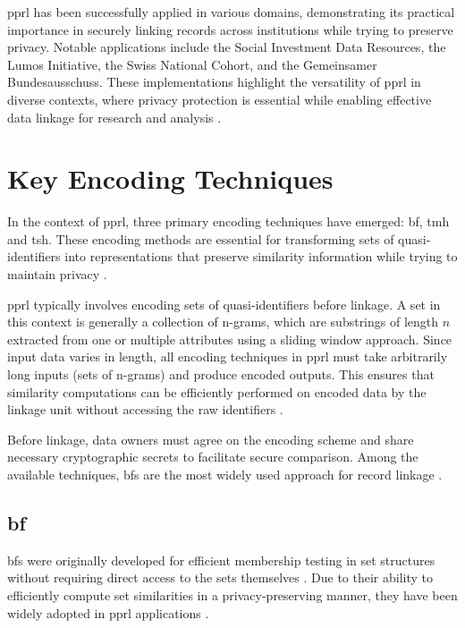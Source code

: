 \ac{pprl} has been successfully applied in various domains, demonstrating its practical importance in securely linking records across institutions while trying to preserve privacy.
Notable applications include the Social Investment Data Resources, the Lumos Initiative, the Swiss National Cohort, and the Gemeinsamer Bundesausschuss.
These implementations highlight the versatility of \ac{pprl} in diverse contexts, where privacy protection is essential while enabling effective data linkage for research and analysis \cite{schaefer2024}.



\section{Key Encoding Techniques} \label{sec:key-encodings}

In the context of \ac{pprl}, three primary encoding techniques have emerged: \ac{bf}, \ac{tmh} and \ac{tsh}.
These encoding methods are essential for transforming sets of quasi-identifiers into representations that preserve similarity information while trying to maintain privacy \cite{schaefer2024,vidanage2020graph, schnell2009privacy}.

\ac{pprl} typically involves encoding sets of quasi-identifiers before linkage.
A set in this context is generally a collection of n-grams, which are substrings of length $n$ extracted from one or multiple attributes using a sliding window approach.
Since input data varies in length, all encoding techniques in \ac{pprl} must take arbitrarily long inputs (sets of n-grams) and produce encoded outputs.
This ensures that similarity computations can be efficiently performed on encoded data by the linkage unit without accessing the raw identifiers \cite{vidanage2020graph,schaefer2024}.

Before linkage, data owners must agree on the encoding scheme and share necessary cryptographic secrets to facilitate secure comparison.
Among the available techniques, \ac{bf}s are the most widely used approach for record linkage \cite{schaefer2024}.

\subsection{\ac{bf}} \label{sec:bf}

\ac{bf}s were originally developed for efficient membership testing in set structures without requiring direct access to the sets themselves \cite{bloom1970space}.
Due to their ability to efficiently compute set similarities in a privacy-preserving manner, they have been widely adopted in \ac{pprl} applications \cite{schaefer2024,vidanage2020graph,schnell2009privacy}.

